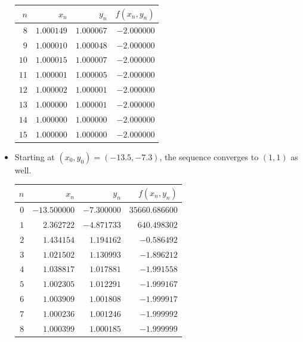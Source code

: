 \begin{example}
\begin{itemize}
\begin{center}
\begin{tabular}{|r|r|r|r|}
	$n$ & $x_n$ & $y_n$ & $f(x_n,y_n)$ \\ \hline \hline 
	$8$ & $1.000149$ & $1.000067$ & $-2.000000$ \\ \hline 
	$9$ & $1.000010$ & $1.000048$ & $-2.000000$ \\ \hline 
	$10$ & $1.000015$ & $1.000007$ & $-2.000000$ \\ \hline 
	$11$ & $1.000001$ & $1.000005$ & $-2.000000$ \\ \hline 
	$12$ & $1.000002$ & $1.000001$ & $-2.000000$ \\ \hline 
	$13$ & $1.000000$ & $1.000001$ & $-2.000000$ \\ \hline 
	$14$ & $1.000000$ & $1.000000$ & $-2.000000$ \\ \hline 
	$15$ & $1.000000$ & $1.000000$ & $-2.000000$ \\ \hline 
	\end{tabular}
	\end{center}
	\item Starting at $(x_0, y_0) = (-13.5, -7.3)$, the sequence converges to $(1,1)$ as well.
	\begin{center}
	\begin{tabular}{|r|r|r|r|} \hline 
	$n$ & $x_n$ & $y_n$ & $f(x_n,y_n)$ \\ \hline \hline 
	$0$ & $-13.500000$ & $-7.300000$ & $35660.686600$ \\ \hline 
	$1$ & $2.362722$ & $-4.871733$ & $640.498302$ \\ \hline 
	$2$ & $1.434154$ & $1.194162$ & $-0.586492$ \\ \hline 
	$3$ & $1.021502$ & $1.130993$ & $-1.896212$ \\ \hline 
	$4$ & $1.038817$ & $1.017881$ & $-1.991558$ \\ \hline 
	$5$ & $1.002305$ & $1.012291$ & $-1.999167$ \\ \hline 
	$6$ & $1.003909$ & $1.001808$ & $-1.999917$ \\ \hline 
	$7$ & $1.000236$ & $1.001246$ & $-1.999992$ \\ \hline 
	$8$ & $1.000399$ & $1.000185$ & $-1.999999$ \\ \hline 

\end{tabular}
\end{center}
\end{itemize}
\end{example}
